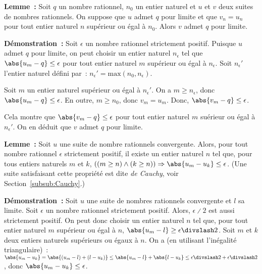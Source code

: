     \done

\medskip

\noindent\textbf{Lemme :} Soit $q$ un nombre rationnel, $n_0$ un entier naturel et $u$ et $v$ deux suites de nombres rationnels. 
    On suppose que $u$ admet $q$ pour limite et que $v_n = u_n$ pour tout entier naturel $n$ supérieur ou égal à $n_0$.
    Alors $v$ admet $q$ pour limite.

\medskip

\noindent\textbf{Démonstration :}
    Soit $\epsilon$ un nombre rationnel strictement positif.
    Puisque $u$ admet $q$ pour limite, on peut choisir un entier naturel $n_\epsilon$ tel que $\abs{u_m - q} \leq \epsilon$ pour tout entier naturel $m$ supérieur ou égal à $n_\epsilon$. 
    Soit $n_\epsilon'$ l'entier naturel défini par : $n_\epsilon' = \mathrm{max} \left( n_0, n_\epsilon \right)$.
    
    Soit $m$ un entier naturel supérieur ou égal à $n_\epsilon'$.
    On a $m \geq n_\epsilon$, donc $\abs{u_m - q} \leq \epsilon$.
    En outre, $m \geq n_0$, donc $v_m = u_m$.
    Donc, $\abs{v_m - q} \leq \epsilon$.
    
    Cela montre que $\abs{v_m - q} \leq \epsilon$ pour tout entier naturel $m$ suérieur ou égal à $n_\epsilon'$. 
    On en déduit que $v$ admet $q$ pour limite.

    \done

\medskip

\noindent\textbf{Lemme :} Soit $u$ une suite de nombre rationnels convergente. 
    Alors, pour tout nombre rationnel $\epsilon$ strictement positif, il existe un entier naturel $n$ tel que, pour tous entiers naturels $m$ et $k$, $((m \geq n) \wedge (k \geq n)) \Rightarrow \abs{u_m - u_k} \leq \epsilon$.
    (Une suite satisfaisant cette propriété est dite \emph{de Cauchy}, voir Section~\ref{subsub:Cauchy}.)

\medskip

\noindent\textbf{Démonstration :} Soit $u$ une suite de nombres rationnels convergente et $l$ sa limite.
    Soit $\epsilon$ un nombre rationnel strictement positif. 
    Alors, $\epsilon \divslash 2$ est aussi strictement positif.
    On peut donc choisir un entier naturel $n$ tel que, pour tout entier naturel $m$ supérieur ou égal à $n$, $\abs{u_m - l} \geq \epsilon \divslash 2$.
    Soit $m$ et $k$ deux entiers naturels supérieurs ou égaux à $n$. 
    On a (en utilisant l'inégalité triangulaire) : $\abs{u_m - u_k} = \abs{(u_m - l) + (l - u_k)} \leq \abs{u_m - l} + \abs{l - u_k} \leq \epsilon \divslash 2 + \epsilon \divslash 2$, donc $\abs{u_m - u_k} \leq \epsilon$. 

